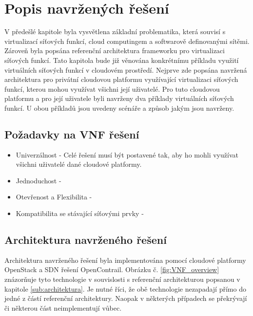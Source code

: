 \chapter{Popis navržených řešení}

V předešlé kapitole byla vysvětlena základní problematika, která souvisí s virtualizací síťových funkcí, cloud computingem a softwarově definovanými sítěmi. Zároveň byla popsána referenční architektura frameworku pro virtualizaci síťových funkcí. Tato kapitola bude již věnována konkrétnímu příkladu využití virtuálních síťových funkcí v cloudovém prostředí. Nejprve zde popsána navržená architektura pro privátní cloudovou platformu využívající virtualizaci síťových funkcí, kterou mohou využívat všichni její uživatelé. Pro tuto cloudovou platformu a pro její uživatele byli navrženy dva příklady virtuálních síťových funkcí. U obou příkladů jsou uvedeny scénáře a způsob jakým jsou navrženy.

\section{Požadavky na VNF řešení}

\begin{itemize}
\item Univerzálnost - Celé řešení musí být postavené tak, aby ho mohli využívat všichni uživatelé dané cloudové platformy. 
\item Jednoduchost - 
\item Otevřenost a Flexibilita - 
\item Kompatibilita se stávající síťovými prvky - 
\end{itemize}

\section{Architektura navrženého řešení}

Architektura navrženého řešení byla implementována pomocí cloudové platformy OpenStack a SDN řešení OpenContrail. Obrázku č. \ref{fig:VNF_overview} znázorňuje tyto technologie v souvislosti s referenční architekturou popsanou v kapitole \ref{sub:architektura}. Je nutné říci, že obě technologie nezapadají přímo do jedné z částí referenční architektury. Naopak v některých případech se překrývají či některou část neimplementují vůbec.

